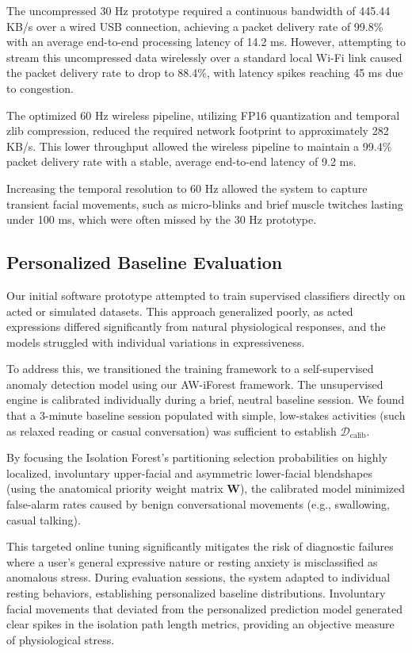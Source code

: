 \documentclass[sigconf]{acmart}
\begin{document}
The uncompressed 30 Hz prototype required a continuous bandwidth of 445.44 KB/s over a wired USB connection, achieving a packet delivery rate of 99.8\% with an average end-to-end processing latency of 14.2 ms. However, attempting to stream this uncompressed data wirelessly over a standard local Wi-Fi link caused the packet delivery rate to drop to 88.4\%, with latency spikes reaching 45 ms due to congestion.

The optimized 60 Hz wireless pipeline, utilizing FP16 quantization and temporal zlib compression, reduced the required network footprint to approximately 282 KB/s. This lower throughput allowed the wireless pipeline to maintain a 99.4\% packet delivery rate with a stable, average end-to-end latency of 9.2 ms. 

Increasing the temporal resolution to 60 Hz allowed the system to capture transient facial movements, such as micro-blinks and brief muscle twitches lasting under 100 ms, which were often missed by the 30 Hz prototype.

\subsection{Personalized Baseline Evaluation}
Our initial software prototype attempted to train supervised classifiers directly on acted or simulated datasets. This approach generalized poorly, as acted expressions differed significantly from natural physiological responses, and the models struggled with individual variations in expressiveness.

To address this, we transitioned the training framework to a self-supervised anomaly detection model using our AW-iForest framework. The unsupervised engine is calibrated individually during a brief, neutral baseline session. We found that a 3-minute baseline session populated with simple, low-stakes activities (such as relaxed reading or casual conversation) was sufficient to establish $\mathcal{D}_{\text{calib}}$. 

By focusing the Isolation Forest’s partitioning selection probabilities on highly localized, involuntary upper-facial and asymmetric lower-facial blendshapes (using the anatomical priority weight matrix $\mathbf{W}$), the calibrated model minimized false-alarm rates caused by benign conversational movements (e.g., swallowing, casual talking). 

This targeted online tuning significantly mitigates the risk of diagnostic failures where a user's general expressive nature or resting anxiety is misclassified as anomalous stress. During evaluation sessions, the system adapted to individual resting behaviors, establishing personalized baseline distributions. Involuntary facial movements that deviated from the personalized prediction model generated clear spikes in the isolation path length metrics, providing an objective measure of physiological stress.
\end{document}

